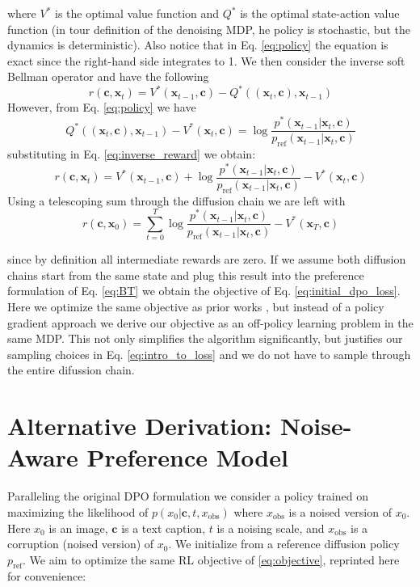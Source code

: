 \documentclass[10pt,twocolumn,letterpaper]{article}
\newcommand{\xobs}{x_{\text{obs}}}
\newcommand{\x}{\ensuremath{\boldsymbol{x}}}
\newcommand{\vc}{\ensuremath{\boldsymbol{c}}}
\newcommand{\pref}{p_{\text{ref}}}
\begin{document}
where $V^*$ is the optimal value function and $Q^*$ is the optimal state-action value function (in tour definition of the denoising MDP, he policy is stochastic, but the dynamics is deterministic). Also notice that in Eq. \ref{eq:policy} the equation is exact since the right-hand side integrates to 1. We then consider the inverse soft Bellman operator \cite{garg2022iqlearn} and have the following
\begin{equation}\label{eq:inverse_reward}
    r(\vc, \x_t) =  V^*(\x_{t-1}, \vc) - Q^*((\x_t, \vc), \x_{t-1})    
\end{equation}
However, from Eq. \ref{eq:policy} we have
\begin{equation}
   Q^*((\x_t, \vc), \x_{t-1})-V^*(\x_t, \vc) = \log \frac{p^*(\x_{t-1}|\x_t, \vc)}{p_{\text{ref}}(\x_{t-1}|\x_t, \vc)}
\end{equation}
substituting in Eq. \ref{eq:inverse_reward} we obtain:
\begin{equation}\label{eq:transform}
    r(\vc, \x_t) = V^*(\x_{t-1}, \vc) + \log \frac{p^*(\x_{t-1}|\x_t, \vc)}{p_{\text{ref}}(\x_{t-1}|\x_t, \vc)} - V^*(\x_t, \vc)
\end{equation}
Using a telescoping sum through the diffusion chain we are left with
\begin{equation}
    r(\vc, \x_0) =\sum_{t=0}^T\log \frac{p^*(\x_{t-1}|\x_t, \vc)}{p_{\text{ref}}(\x_{t-1}|\x_t, \vc)} - V^*(\x_T, \vc)
\end{equation}

since by definition all intermediate rewards are zero. If we assume both diffusion chains start from the same state and plug this result into the preference formulation of Eq. \ref{eq:BT} we obtain the objective of Eq. \ref{eq:initial_dpo_loss}. Here we optimize the same objective as prior works \cite{ddpo, dpok}, but instead of a policy gradient approach we derive our objective as an off-policy learning problem in the same MDP. This not only simplifies the algorithm significantly, but justifies our sampling choices in Eq. \ref{eq:intro_to_loss} and we do not have to sample through the entire difussion chain. 




\section{Alternative Derivation: Noise-Aware Preference Model}\label{sec:bram_derivation}

Paralleling the original DPO formulation we consider a policy trained on maximizing the likelihood of $p(x_0 | \vc, t, \xobs)$ where $\xobs$ is a noised version of $x_0$.
Here $x_0$ is an image, $\vc$ is a text caption, $t$ is a noising scale, and $\xobs$ is a corruption (noised version) of $x_0$.
We initialize from a reference diffusion policy $\pref$.
We aim to optimize the same RL objective of \cref{eq:objective}, reprinted here for convenience:
\end{document}

